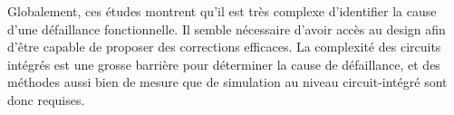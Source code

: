 Globalement, ces études montrent qu'il est très complexe d'identifier la cause d'une défaillance fonctionnelle.
Il semble nécessaire d'avoir accès au design afin d'être capable de proposer des corrections efficaces.
La complexité des circuits intégrés est une grosse barrière pour déterminer la cause de défaillance, et des méthodes aussi bien de mesure que de simulation au niveau circuit-intégré sont donc requises.
